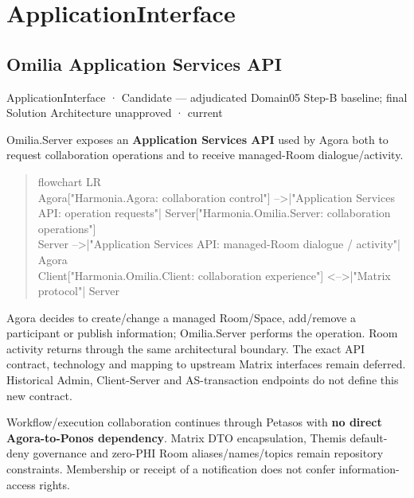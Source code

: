 \section{ApplicationInterface}

\subsection{Omilia Application Services API}

\label{element:49c52c0466bc4760a11e0ca6fe8142c0}
{\small ApplicationInterface · Candidate — adjudicated Domain05 Step-B baseline; final Solution Architecture unapproved · current}\par

Omilia.Server exposes an \textbf{Application Services API} used by Agora both to
request collaboration operations and to receive managed-Room dialogue/activity.



\begin{quote}\small\ttfamily
flowchart LR\\
    Agora["Harmonia.Agora: collaboration control"] -->|"Application Services API: operation requests"| Server["Harmonia.Omilia.Server: collaboration operations"]\\
    Server -->|"Application Services API: managed-Room dialogue / activity"| Agora\\
    Client["Harmonia.Omilia.Client: collaboration experience"] <-->|"Matrix protocol"| Server\\

\end{quote}


Agora decides to create/change a managed Room/Space, add/remove a participant or
publish information; Omilia.Server performs the operation. Room activity returns
through the same architectural boundary. The exact API contract, technology and
mapping to upstream Matrix interfaces remain deferred. Historical Admin,
Client-Server and AS-transaction endpoints do not define this new contract.



Workflow/execution collaboration continues through Petasos with \textbf{no direct
Agora-to-Ponos dependency}. Matrix DTO encapsulation, Themis default-deny
governance and zero-PHI Room aliases/names/topics remain repository constraints.
Membership or receipt of a notification does not confer information-access rights.




